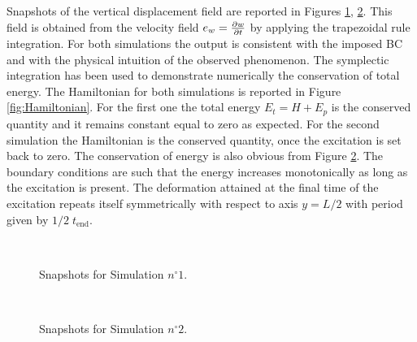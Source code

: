 \documentclass[preprint,12pt]{elsarticle}
\begin{document}
{Snapshots of the vertical displacement field are reported in Figures \ref{fig:sim1}, \ref{fig:sim2}. This field is obtained from the velocity field $e_w = \diffp{w}{t}$ by applying the trapezoidal rule integration. For both simulations the output is consistent with the imposed BC and with the physical intuition of the observed phenomenon. The symplectic integration has been used to demonstrate numerically the conservation of total energy. The Hamiltonian for both simulations is reported in Figure \ref{fig:Hamiltonian}. For the first one the total energy $E_t = H + E_p$ is the conserved quantity and it remains constant equal to zero as expected. For the second simulation the Hamiltonian is the conserved quantity, once the excitation is set back to zero. The conservation of energy is also obvious from Figure \ref{fig:sim2}. The boundary conditions are such that the energy increases monotonically as long as the excitation is present.  The deformation attained at the final time of the excitation  repeats itself symmetrically with respect to axis $y = L/2$ with period given by $1/2 \; t_{\text{end}}$.
} 

\begin{figure}[t]%
	\centering
	\hspace{8pt}%
	 \\
	\hspace{8pt}%
	\caption[Snapshots of the displacement field]{Snapshots for Simulation $n^\circ 1$.}%
	\label{fig:sim1}%
\end{figure}
\begin{figure}[h]%
	\centering
	\hspace{8pt}%
	 \\
	\hspace{8pt}%
	\caption[Snapshots of the displacement field]{Snapshots for Simulation $n^\circ 2$.}%
	\label{fig:sim2}%
\end{figure}
\end{document}
